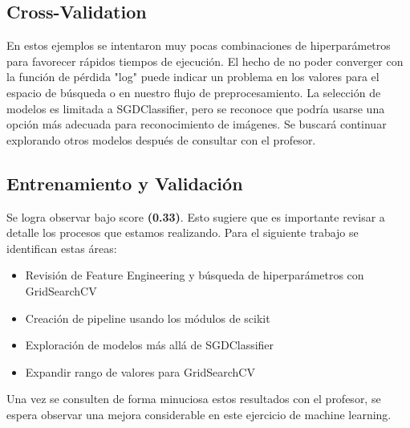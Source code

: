 \documentclass[journal]{IEEEtran}
\begin{document}
\subsection{Cross-Validation}
En estos ejemplos se intentaron muy pocas combinaciones de hiperparámetros para favorecer rápidos tiempos de ejecución. El hecho de no poder converger con la función de pérdida "log" puede indicar un problema en los valores para el espacio de búsqueda o en nuestro flujo de preprocesamiento. La selección de modelos es limitada a SGDClassifier, pero se reconoce que podría usarse una opción más adecuada para reconocimiento de imágenes. Se buscará continuar explorando otros modelos después de consultar con el profesor.

\subsection{Entrenamiento y Validación}
Se logra observar bajo score \textbf{(0.33)}. Esto sugiere que es importante revisar a detalle los procesos que estamos realizando. Para el siguiente trabajo se identifican estas áreas:
\begin{itemize}
        \item Revisión de Feature Engineering y búsqueda de hiperparámetros con GridSearchCV
        \item Creación de pipeline usando los módulos de scikit\cite{scikit-learn_pipeline}
        \item Exploración de modelos más allá de SGDClassifier
        \item Expandir rango de valores para GridSearchCV
\end{itemize}

Una vez se consulten de forma minuciosa estos resultados con el profesor, se espera observar una mejora considerable en este ejercicio de machine learning.

%


\printbibliography
\end{document}
